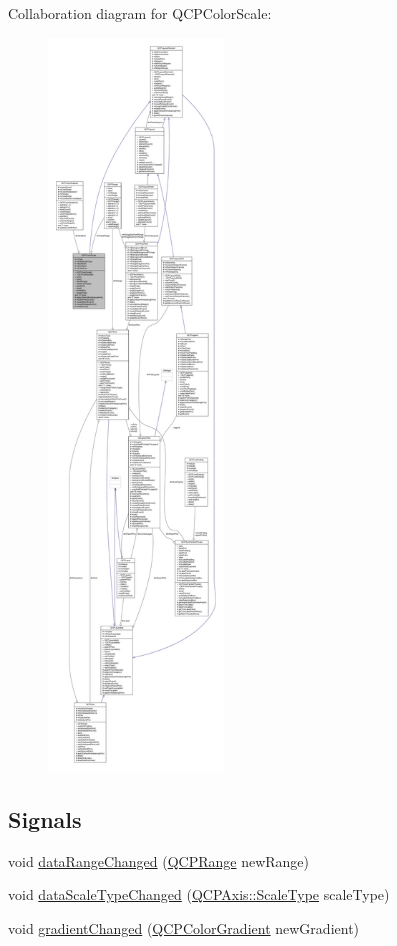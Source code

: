 Collaboration diagram for Q\+C\+P\+Color\+Scale\+:\nopagebreak
\begin{figure}[H]
\begin{center}
\leavevmode
\includegraphics[height=550pt]{class_q_c_p_color_scale__coll__graph}
\end{center}
\end{figure}
\subsection*{Signals}
\begin{DoxyCompactItemize}
\item 
void \hyperlink{class_q_c_p_color_scale_a293176da9447ec6819be1d901966a257}{data\+Range\+Changed} (\hyperlink{class_q_c_p_range}{Q\+C\+P\+Range} new\+Range)
\item 
void \hyperlink{class_q_c_p_color_scale_a61558b962f7791ff2f15a565dcf60181}{data\+Scale\+Type\+Changed} (\hyperlink{class_q_c_p_axis_a36d8e8658dbaa179bf2aeb973db2d6f0}{Q\+C\+P\+Axis\+::\+Scale\+Type} scale\+Type)
\item 
void \hyperlink{class_q_c_p_color_scale_a67a5eb06cf551d322885e8635a46378c}{gradient\+Changed} (\hyperlink{class_q_c_p_color_gradient}{Q\+C\+P\+Color\+Gradient} new\+Gradient)
\end{DoxyCompactItemize}
